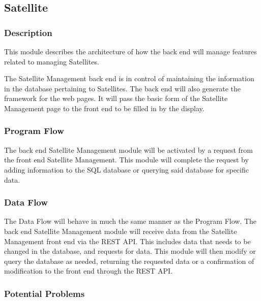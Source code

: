 
\subsection{Satellite}

\subsubsection{Description}

This module describes the architecture of how the back end will manage features related to managing Satellites. 

The Satellite Management back end is in control of maintaining the information in the database pertaining to Satellites. 
The back end will also generate the framework for the web pages. 
It will pass the basic form of the Satellite Management page to the front end to be filled in by the display. 

\subsubsection{Program Flow}

The back end Satellite Management module will be activated by a request from the front end Satellite Management. 
This module will complete the request by adding information to the SQL database or querying said database for specific data. 

\subsubsection{Data Flow}

The Data Flow will behave in much the same manner as the Program Flow. 
The back end Satellite Management module will receive data from the Satellite Management front end via the REST API. 
This includes data that needs to be changed in the database, and requests for data. 
This module will then modify or query the database as needed, 
returning the requested data or a confirmation of modification to the front end through the REST API. 

\subsubsection{Potential Problems}

